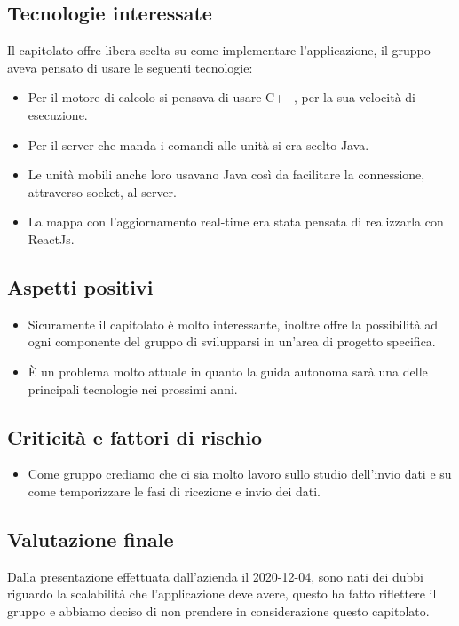 \subsection{Tecnologie interessate}
Il capitolato offre libera scelta su come implementare l'applicazione, il gruppo aveva pensato di usare le seguenti tecnologie:
\begin{itemize}
\item Per il motore di calcolo si pensava di usare C++, per la sua velocità di esecuzione.
\item Per il server che manda i comandi alle unità si era scelto Java.
\item Le unità mobili anche loro usavano Java così da facilitare la connessione, attraverso socket, al server.
\item La mappa con l'aggiornamento real-time era stata pensata di realizzarla con ReactJs.
\end{itemize}

\subsection{Aspetti positivi}
\begin{itemize}
\item Sicuramente il capitolato è molto interessante, inoltre offre la possibilità ad ogni componente del gruppo di svilupparsi in un'area di progetto specifica.
\item È un problema molto attuale in quanto la guida autonoma sarà una delle principali tecnologie nei prossimi anni.
\end{itemize}

\subsection{Criticità e fattori di rischio}
\begin{itemize}
\item Come gruppo crediamo che ci sia molto lavoro sullo studio dell'invio dati e su come temporizzare le fasi di ricezione e invio dei dati.
\end{itemize}

\subsection{Valutazione finale}
Dalla presentazione effettuata dall'azienda il 2020-12-04, sono nati dei dubbi riguardo la scalabilità che l'applicazione deve avere, questo ha fatto riflettere il gruppo e abbiamo deciso di non prendere in considerazione questo capitolato.